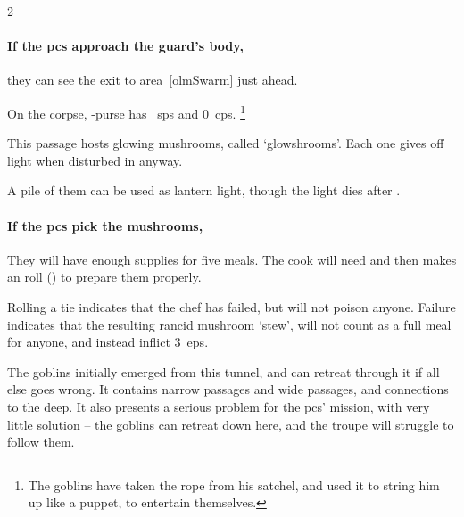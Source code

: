 \begin{multicols}{2}
\paragraph{If the \glspl{pc} approach the \gls{guard}'s body,}
they can see the exit to \gls{area}~\vref{olmSwarm} just ahead.

\label{caveCoinsIII}
On the corpse, -purse has ~\glspl{sp} and 0~\glspl{cp}.%
\footnote{The goblins have taken the rope from his satchel, and used it to string him up like a puppet, to entertain themselves.}
\setcounter{diceNo}{0}%
\renewcommand\npcsymbol{\currency}


\caveMapOut[t]


This passage hosts glowing mushrooms, called `\glspl{glowshroom}'.
Each one gives off light when disturbed in anyway.

A pile of them can be used as lantern light, though the light dies after .

\paragraph{If the \glspl{pc} pick the mushrooms,}
They will have enough supplies for five meals.
The cook will need  and then makes an  roll (\tn[10]) to prepare them properly.

Rolling a tie indicates that the chef has failed, but will not poison anyone.
Failure indicates that the resulting rancid mushroom `stew', will not count as a full meal for anyone, and instead inflict 3~\glspl{ep}.



The goblins initially emerged from this tunnel, and can retreat through it if all else goes wrong.
It contains narrow passages and wide passages, and connections to the \gls{deep}.
It also presents a serious problem for the \glspl{pc}' mission, with very little solution -- the goblins can retreat down here, and the troupe will struggle to follow them.


\end{multicols}
